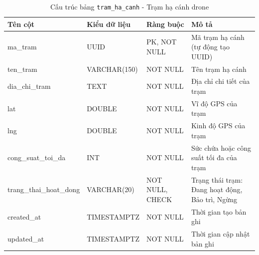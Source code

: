 \begin{table}[H]
  \centering
  \begin{tabularx}{\textwidth}{|l|l|l|>{\raggedright\arraybackslash}X|}
    \hline
    \textbf{Tên cột} & \textbf{Kiểu dữ liệu} & \textbf{Ràng buộc} & \textbf{Mô tả} \\
    \hline
    ma\_tram             & UUID            & PK, NOT NULL    & Mã trạm hạ cánh (tự động tạo UUID) \\ \hline
    ten\_tram            & VARCHAR(150)    & NOT NULL        & Tên trạm hạ cánh \\ \hline
    dia\_chi\_tram       & TEXT            & NOT NULL        & Địa chỉ chi tiết của trạm \\ \hline
    lat                  & DOUBLE          & NOT NULL        & Vĩ độ GPS của trạm \\ \hline
    lng                  & DOUBLE          & NOT NULL        & Kinh độ GPS của trạm \\ \hline
    cong\_suat\_toi\_da  & INT             & NOT NULL        & Sức chứa hoặc công suất tối đa của trạm \\ \hline
    trang\_thai\_hoat\_dong & VARCHAR(20)     & NOT NULL, CHECK & Trạng thái trạm: Đang hoạt động, Bảo trì, Ngừng \\ \hline
    created\_at          & TIMESTAMPTZ     & NOT NULL        & Thời gian tạo bản ghi \\ \hline
    updated\_at          & TIMESTAMPTZ     & NOT NULL        & Thời gian cập nhật bản ghi \\
    \hline
  \end{tabularx}
  \caption{Cấu trúc bảng \texttt{tram\_ha\_canh} - Trạm hạ cánh drone}
  \label{tab:db-tram-ha-canh}
\end{table}


